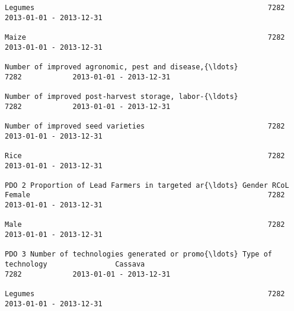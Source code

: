 \documentclass[11pt]{article}
\begin{document}
\begin{Verbatim}[commandchars=\\\{\}]
                                                                                                                                                              Legumes                                                       7282            2013-01-01 - 2013-12-31   
                                                                                                                                                              Maize                                                         7282            2013-01-01 - 2013-12-31   
                                                                                                                                                              Number of improved agronomic, pest and disease,{\ldots}            7282            2013-01-01 - 2013-12-31   
                                                                                                                                                              Number of improved post-harvest storage, labor-{\ldots}            7282            2013-01-01 - 2013-12-31   
                                                                                                                                                              Number of improved seed varieties                             7282            2013-01-01 - 2013-12-31   
                                                                                                                                                              Rice                                                          7282            2013-01-01 - 2013-12-31   
                                                                         PDO 2 Proportion of Lead Farmers in targeted ar{\ldots} Gender RCoL                       Female                                                        7282            2013-01-01 - 2013-12-31   
                                                                                                                                                              Male                                                          7282            2013-01-01 - 2013-12-31   
                                                                         PDO 3 Number of technologies generated or promo{\ldots} Type of technology                Cassava                                                       7282            2013-01-01 - 2013-12-31   
                                                                                                                                                              Legumes                                                       7282            2013-01-01 - 2013-12-31   

\end{Verbatim}
\end{document}

